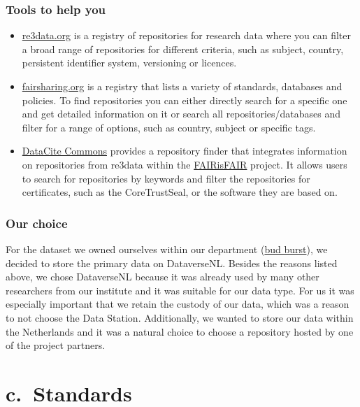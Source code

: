 \documentclass[
  oneside]{book}
\begin{document}
\section{Tools to help you}\label{tools-to-help-you}

\begin{itemize}
\item
  \href{http://re3data.org}{re3data.org} is a registry of repositories for research data where you can filter a broad range of repositories for different criteria, such as subject, country, persistent identifier system, versioning or licences.
\item
  \href{http://fairsharing.org}{fairsharing.org} is a registry that lists a variety of standards, databases and policies. To find repositories you can either directly search for a specific one and get detailed information on it or search all repositories/databases and filter for a range of options, such as country, subject or specific tags.
\item
  \href{https://commons.datacite.org/}{DataCite Commons} provides a repository finder that integrates information on repositories from re3data within the \href{https://www.fairsfair.eu/}{FAIRisFAIR} project. It allows users to search for repositories by keywords and filter the repositories for certificates, such as the CoreTrustSeal, or the software they are based on.
\end{itemize}

\section{Our choice}\label{our-choice}

For the dataset we owned ourselves within our department (\hyperref[budburst]{bud burst}), we decided to store the primary data on DataverseNL. Besides the reasons listed above, we chose DataverseNL because it was already used by many other researchers from our institute and it was suitable for our data type. For us it was especially important that we retain the custody of our data, which was a reason to not choose the Data Station. Additionally, we wanted to store our data within the Netherlands and it was a natural choice to choose a repository hosted by one of the project partners.

\part*{c.~Standards}\label{part-c.-standards}
\end{document}
